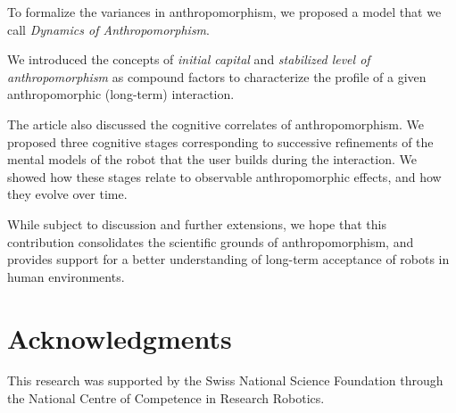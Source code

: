 \documentclass{frontiersSCNS} %
\begin{document}
To formalize the variances in anthropomorphism, we proposed a model that we call
\textit{Dynamics of Anthropomorphism}.  

We introduced the concepts of \emph{initial capital} and \emph{stabilized level
of anthropomorphism} as compound factors to characterize the profile of a given
anthropomorphic (long-term) interaction.

The article also discussed the cognitive correlates of anthropomorphism. We
proposed three cognitive stages corresponding to successive refinements of the
mental models of the robot that the user builds during the interaction. We
showed how these stages relate to observable anthropomorphic effects, and how
they evolve over time.

While subject to discussion and further extensions, we hope that this
contribution consolidates the scientific grounds of anthropomorphism, and
provides support for a better understanding of long-term acceptance of robots in
human environments.


\section*{Acknowledgments}

This research was supported by the Swiss National Science Foundation through the
National Centre of Competence in Research Robotics.

\end{document}
